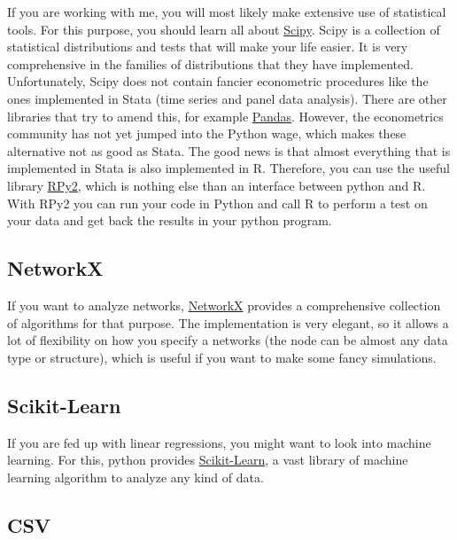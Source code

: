 \documentclass[11pt]{article}
\begin{document}
If you are working with me, you will most likely make extensive use of statistical tools. For this purpose, you should learn all about \href{http://docs.scipy.org/doc/scipy/reference/tutorial/}{Scipy}. Scipy is a collection of statistical distributions and tests that will make your life easier. It is very comprehensive in the families of distributions that they have implemented. Unfortunately, Scipy does not contain fancier econometric procedures like the ones implemented in Stata (time series and panel data analysis). There are other libraries that try to amend this, for example \href{http://pandas.pydata.org/}{Pandas}. However, the econometrics community has not yet jumped into the Python wage, which makes these alternative not as good as Stata. The good news is that almost everything that is implemented in Stata is also implemented in R. Therefore, you can use the useful library \href{http://rpy.sourceforge.net/}{RPy2}, which is nothing else than an interface between python and R. With RPy2 you can run your code in Python and call R to perform a test on your data and get back the results in your python program.



\subsection{NetworkX}

If you want to analyze networks, \href{http://networkx.github.io/documentation/latest/tutorial/}{NetworkX} provides a comprehensive collection of algorithms for that purpose. The implementation is very elegant, so it allows a lot of flexibility on how you specify a networks (the node can be almost any data type or structure), which is useful if you want to make some fancy simulations.



\subsection{Scikit-Learn}

If you are fed up with linear regressions, you might want to look into machine learning. For this, python provides \href{http://scikit-learn.org/stable/tutorial/}{Scikit-Learn}, a vast library of machine learning algorithm to analyze any kind of data.



\subsection{CSV}
\end{document}
